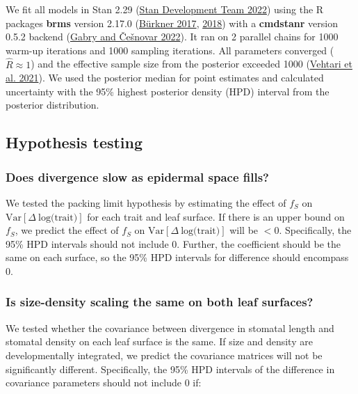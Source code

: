 \documentclass[
  12pt,
]{article}
\begin{document}
We fit all models in Stan 2.29 (\protect\hyperlink{ref-stan_development_team_stan_2022}{Stan Development Team 2022}) using the R packages \textbf{brms} version 2.17.0 (\protect\hyperlink{ref-burkner_brms_2017}{Bürkner 2017}, \protect\hyperlink{ref-burkner_advanced_2018}{2018}) with a \textbf{cmdstanr} version 0.5.2 backend (\protect\hyperlink{ref-gabry_cmdstanr_2022}{Gabry and Češnovar 2022}). It ran on 2 parallel chains for 1000 warm-up iterations and 1000 sampling iterations. All parameters converged (\(\hat{R} \approx 1\)) and the effective sample size from the posterior exceeded 1000 (\protect\hyperlink{ref-vehtari_rank-normalization_2021}{Vehtari et al. 2021}). We used the posterior median for point estimates and calculated uncertainty with the 95\% highest posterior density (HPD) interval from the posterior distribution.

\hypertarget{hypothesis-testing}{%
\subsection{Hypothesis testing}\label{hypothesis-testing}}

\hypertarget{does-divergence-slow-as-epidermal-space-fills}{%
\subsubsection{Does divergence slow as epidermal space fills?}\label{does-divergence-slow-as-epidermal-space-fills}}

We tested the packing limit hypothesis by estimating the effect of \(f_S\) on \(\textrm{Var}[\Delta~\textrm{log(trait)}]\) for each trait and leaf surface. If there is an upper bound on \(f_S\), we predict the effect of \(f_S\) on \(\textrm{Var}[\Delta~\textrm{log(trait)}]\) will be \(<0\). Specifically, the 95\% HPD intervals should not include 0. Further, the coefficient should be the same on each surface, so the 95\% HPD intervals for difference should encompass 0.

\hypertarget{is-size-density-scaling-the-same-on-both-leaf-surfaces}{%
\subsubsection{Is size-density scaling the same on both leaf surfaces?}\label{is-size-density-scaling-the-same-on-both-leaf-surfaces}}

We tested whether the covariance between divergence in stomatal length and stomatal density on each leaf surface is the same. If size and density are developmentally integrated, we predict the covariance matrices will not be significantly different. Specifically, the 95\% HPD intervals of the difference in covariance parameters should not include 0 if:
\end{document}
